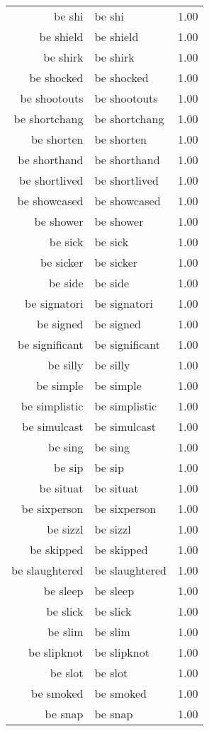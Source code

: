 \begin{table}[ht]
\begin{tabular}{rlr}
  be shi & be shi & 1.00 \\ 
  be shield & be shield & 1.00 \\ 
  be shirk & be shirk & 1.00 \\ 
  be shocked & be shocked & 1.00 \\ 
  be shootouts & be shootouts & 1.00 \\ 
  be shortchang & be shortchang & 1.00 \\ 
  be shorten & be shorten & 1.00 \\ 
  be shorthand & be shorthand & 1.00 \\ 
  be shortlived & be shortlived & 1.00 \\ 
  be showcased & be showcased & 1.00 \\ 
  be shower & be shower & 1.00 \\ 
  be sick & be sick & 1.00 \\ 
  be sicker & be sicker & 1.00 \\ 
  be side & be side & 1.00 \\ 
  be signatori & be signatori & 1.00 \\ 
  be signed & be signed & 1.00 \\ 
  be significant & be significant & 1.00 \\ 
  be silly & be silly & 1.00 \\ 
  be simple & be simple & 1.00 \\ 
  be simplistic & be simplistic & 1.00 \\ 
  be simulcast & be simulcast & 1.00 \\ 
  be sing & be sing & 1.00 \\ 
  be sip & be sip & 1.00 \\ 
  be situat & be situat & 1.00 \\ 
  be sixperson & be sixperson & 1.00 \\ 
  be sizzl & be sizzl & 1.00 \\ 
  be skipped & be skipped & 1.00 \\ 
  be slaughtered & be slaughtered & 1.00 \\ 
  be sleep & be sleep & 1.00 \\ 
  be slick & be slick & 1.00 \\ 
  be slim & be slim & 1.00 \\ 
  be slipknot & be slipknot & 1.00 \\ 
  be slot & be slot & 1.00 \\ 
  be smoked & be smoked & 1.00 \\ 
  be snap & be snap & 1.00 \\ 

\end{tabular}
\end{table}
